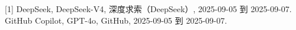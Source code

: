 [1] DeepSeek, DeepSeek-V4, 深度求索（DeepSeek）, 2025-09-05 到 2025-09-07.\\
[2] GitHub Copilot, GPT-4o, GitHub, 2025-09-05 到 2025-09-07.\\
